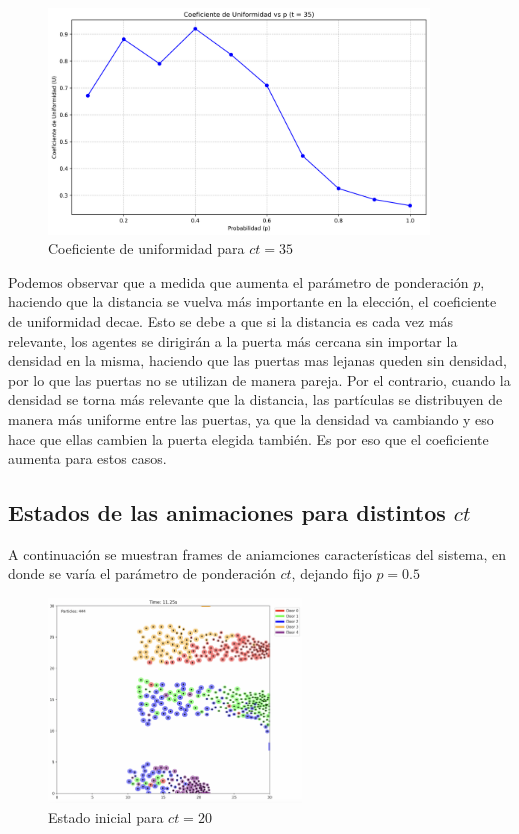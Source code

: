 \documentclass[12pt]{article}
\begin{document}
\begin{figure}[H]
    \centering
    \includegraphics[width=0.9\textwidth]{img/uniformity_vs_p_t35.png}
    \caption{Coeficiente de uniformidad para $ct=35$}
    \label{fig:flow_p100}
\end{figure}
Podemos observar que a medida que aumenta el parámetro de ponderación $p$, haciendo que la distancia se vuelva más importante en la elección, el coeficiente de uniformidad decae. Esto se debe a que si la distancia es cada vez más relevante, los agentes se dirigirán a la puerta más cercana sin importar la densidad en la misma, haciendo que las puertas mas lejanas queden sin densidad, por lo que las puertas no se utilizan de manera pareja. Por el contrario, cuando la densidad se torna más relevante que la distancia, las partículas se distribuyen de manera más uniforme entre las puertas, ya que la densidad va cambiando y eso hace que ellas cambien la puerta elegida también. Es por eso que el coeficiente aumenta para estos casos.

\subsection{Estados de las animaciones para distintos $ct$}

A continuación se muestran frames de aniamciones características del sistema, en donde se varía el parámetro de ponderación $ct$, dejando fijo $p = 0.5$
\begin{figure}[H]
\centering
\includegraphics[width=0.6\textwidth]{img/frames/t_20_&_p_0.50_middle.jpg}
\caption{Estado inicial para $ct=20$}
\label{fig:evac_time_ct}
\end{figure}
\end{document}
